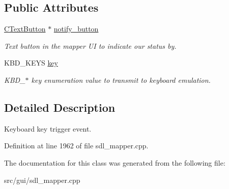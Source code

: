\subsection*{Public Attributes}
\begin{DoxyCompactItemize}
\item 
\hypertarget{classCKeyEvent_a93407353bb472fc93fa7962f1c2e7933}{\hyperlink{classCTextButton}{C\-Text\-Button} $\ast$ \hyperlink{classCKeyEvent_a93407353bb472fc93fa7962f1c2e7933}{notify\-\_\-button}}\label{classCKeyEvent_a93407353bb472fc93fa7962f1c2e7933}

\begin{DoxyCompactList}\small\item\em Text button in the mapper U\-I to indicate our status by. \end{DoxyCompactList}\item 
\hypertarget{classCKeyEvent_aa5d774b3b526c036d79dbf87ba437afd}{K\-B\-D\-\_\-\-K\-E\-Y\-S \hyperlink{classCKeyEvent_aa5d774b3b526c036d79dbf87ba437afd}{key}}\label{classCKeyEvent_aa5d774b3b526c036d79dbf87ba437afd}

\begin{DoxyCompactList}\small\item\em K\-B\-D\-\_\-$\ast$ key enumeration value to transmit to keyboard emulation. \end{DoxyCompactList}\end{DoxyCompactItemize}


\subsection{Detailed Description}
Keyboard key trigger event. 

Definition at line 1962 of file sdl\-\_\-mapper.\-cpp.



The documentation for this class was generated from the following file\-:\begin{DoxyCompactItemize}
\item 
src/gui/sdl\-\_\-mapper.\-cpp\end{DoxyCompactItemize}
